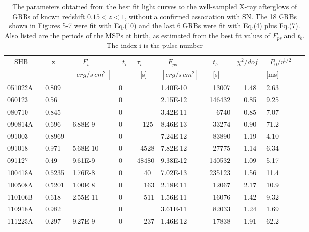 \documentclass[twocolumn]{aastex61}
\begin{document}
\begin{table*}
\caption{The parameters  obtained from the best fit
light curves to   the well-sampled  X-ray afterglows of GRBs 
of known redshift  $0.15<z<1$, without
a confirmed association with SN.  
The 18  GRBs shown in Figures  5-7  were fit  with Eq.(10) and the last 6 GRBs  
were fit with Eq.(4) plus Eq.(7). 
Also listed are the periods  of
the MSPs at birth, as estimated from the best fit values of
$F_{ps}$ and $t_b$.  The index i is the pulse number}
\centering

\begin{tabular}{l l l l l l l l l l}
\hline
\hline
~~SHB~~~&~~z~~~&~~~$F_i$~~~~&~$t_i$~&$\tau_i$~~&~~$F_{ps}$~~&~$t_b$&$\chi^2/dof$&~$P_0/\eta^{1/2}$~\\
        &     &$[erg/s\,cm^2\,]$&        &   ~[s]~  &$[erg/s\,cm^2]$~& ~[s]~&   & [ms] \\
\hline
051022A  &0.809~ &           & 0 &        & 1.40E-10 & ~13007&~~1.48~& 2.63 \\
060123~  &0.56~~ &           & 0 &        & 2.15E-12 & 146432&~~0.85~& 9.25 \\
080710~  &0.845~ &           & 0 &        & 3.42E-11 & ~~6740&~~0.85~& 7.07 \\
090814A  &0.696  &  6.88E-9  & 0 & ~ 125  & 8.46E-13 & ~33274&~~0.90~& 71.2 \\
091003~  &0.8969 &           & 0 &        & 7.24E-12 & ~83890&~~1.19~& 4.10 \\
091018~  &0.971~ &  5.68E-10 & 0 & ~4528  & 7.82E-12 & ~27775&~~1.14~& 6.34 \\

091127~  &0.49~~ &  9.61E-9~ & 0 & 48480  & 9.38E-12 & 140532&~~1.09~& 5.17 \\
100418A  &0.6235 &  1.76E-8~ & 0 & ~~40   & 7.02E-13 & 235123&~~1.56~& 11.4 \\
100508A  &0.5201 &  1.00E-8~ & 0 & ~~163  & 2.18E-11 & ~12067&~~2.17~& 10.9 \\
110106B  &0.618~ &  2.55E-11 & 0 & ~~511  & 1.56E-11 & ~16076&~~1.42~& 9.32 \\
110918A  &0.982~ &           & 0 &        & 3.61E-11 & ~82033&~~1.24~& 1.69 \\
111225A  &0.297~ &  9.27E-9~ & 0 & ~~237  & 1.46E-12 & ~17838&~~1.91~& 62.2 \\


\end{tabular}
\end{table*}
\end{document}
